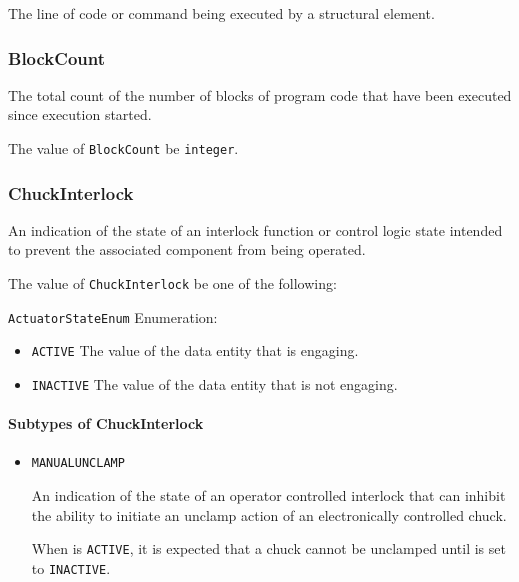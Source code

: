 The line of code or command being executed by a  \gls{structural element}.



\subsubsection{BlockCount}
\label{sec:BlockCount}



The total count of the number of blocks of program code that have been executed since execution started.


The value of \texttt{BlockCount} \MUST be \texttt{integer}.



\subsubsection{ChuckInterlock}




An indication of the state of an interlock function or control logic state intended to prevent the associated  component from being operated.


The value of \texttt{ChuckInterlock} \MUST be one of the following: 


\texttt{ActuatorStateEnum} Enumeration:

\begin{itemize}
\item \texttt{ACTIVE} \newline The value of the \gls{data entity} that is engaging. 
\item \texttt{INACTIVE} \newline The value of the \gls{data entity} that is not engaging. 
\end{itemize}


\paragraph{Subtypes of ChuckInterlock}\mbox{}
\label{sec:Subtypes of ChuckInterlock}

\begin{itemize}

\item \texttt{MANUAL\textunderscore UNCLAMP}


An indication of the state of an operator controlled interlock that can inhibit the ability to initiate an unclamp action of an electronically controlled chuck.

When  is \texttt{ACTIVE}, it is expected that a chuck cannot be unclamped until  is set to \texttt{INACTIVE}. 


\end{itemize}




